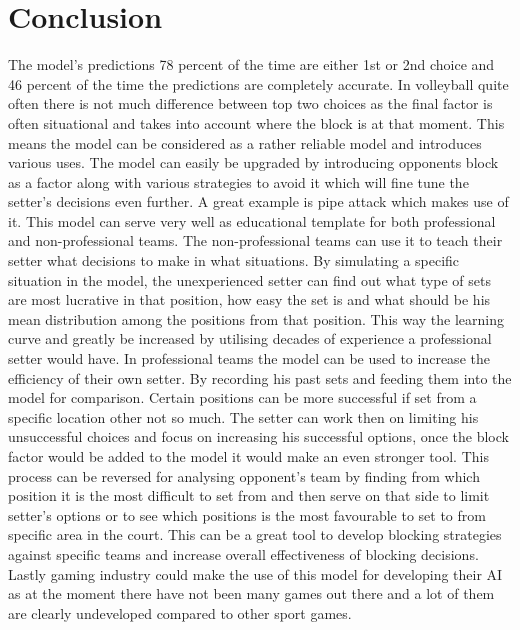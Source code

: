 \documentclass[main.tex]{subfiles}
\begin{document}
  \section{Conclusion}
    The model’s predictions 78 percent of the time are either 1st or 2nd choice and 46 percent of the time the predictions are completely accurate. In volleyball quite often there is not much difference between top two choices as the final factor is often situational and takes into account where the block is at that moment. This means the model can be considered as a rather reliable model and introduces various uses. The model can easily be upgraded by introducing opponents block as a factor along with various strategies to avoid it which will fine tune the setter’s decisions even further. A great example is pipe attack which makes use of it. This model can serve very well as educational template for both professional and non-professional teams. The non-professional teams can use it to teach their setter what decisions to make in what situations. By simulating a specific situation in the model, the unexperienced setter can find out what type of sets are most lucrative in that position, how easy the set is and what should be his mean distribution among the positions from that position. This way the learning curve and greatly be increased by utilising decades of experience a professional setter would have. In professional teams the model can be used to increase the efficiency of their own setter. By recording his past sets and feeding them into the model for comparison. Certain positions can be more successful if set from a specific location other not so much. The setter can work then on limiting his unsuccessful choices and focus on increasing his successful options, once the block factor would be added to the model it would make an even stronger tool. This process can be reversed for analysing opponent’s team by finding from which position it is the most difficult to set from and then serve on that side to limit setter’s options or to see which positions is the most favourable to set to from specific area in the court. This can be a great tool to develop blocking strategies against specific teams and increase overall effectiveness of blocking decisions. Lastly gaming industry could make the use of this model for developing their AI as at the moment there have not been many games out there and a lot of them are clearly undeveloped compared to other sport games. 
\end{document}
